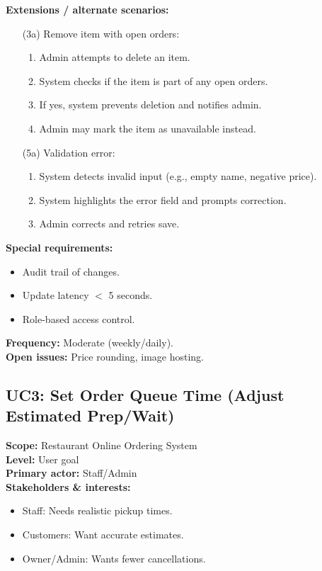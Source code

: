 \documentclass{article}
\begin{document}
\textbf{Extensions / alternate scenarios:}
\begin{itemize}
    \item[(3a)] Remove item with open orders:
    \begin{enumerate}
        \item Admin attempts to delete an item.
        \item System checks if the item is part of any open orders.
        \item If yes, system prevents deletion and notifies admin.
        \item Admin may mark the item as unavailable instead.
    \end{enumerate}

    \item[(5a)] Validation error:
    \begin{enumerate}
        \item System detects invalid input (e.g., empty name, negative price).
        \item System highlights the error field and prompts correction.
        \item Admin corrects and retries save.
    \end{enumerate}


\end{itemize}


\textbf{Special requirements:}
\begin{itemize}
    \item Audit trail of changes.
    \item Update latency $<$ 5 seconds.
    \item Role-based access control.
\end{itemize}

\textbf{Frequency:} Moderate (weekly/daily).\\
\textbf{Open issues:} Price rounding, image hosting.

\subsection*{UC3: Set Order Queue Time (Adjust Estimated Prep/Wait)}
\textbf{Scope:} Restaurant Online Ordering System \\
\textbf{Level:} User goal \\
\textbf{Primary actor:} Staff/Admin \\

\textbf{Stakeholders \& interests:}
\begin{itemize}
    \item Staff: Needs realistic pickup times.
    \item Customers: Want accurate estimates.
    \item Owner/Admin: Wants fewer cancellations.
\end{itemize}
\end{document}
